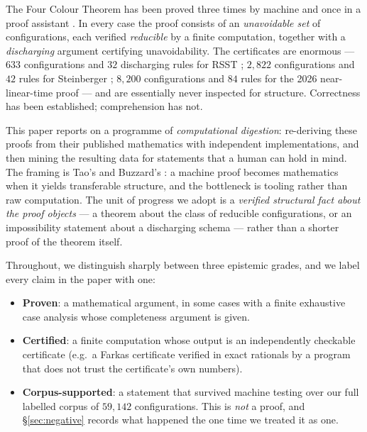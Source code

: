 \documentclass[11pt]{article}
\theoremstyle{definition}
\begin{document}
The Four Colour Theorem has been proved three times by machine
\cite{appel1977every,appel1977every2,rsst1997,steinberger2010,nl4ct2026} and once in
a proof assistant \cite{gonthier2008}. In every case the proof consists of an
\emph{unavoidable set} of configurations, each verified \emph{reducible} by a
finite computation, together with a \emph{discharging} argument certifying
unavoidability. The certificates are enormous --- $633$ configurations and
$32$ discharging rules for RSST \cite{rsst1997}; $2{,}822$ configurations and $42$
rules for Steinberger \cite{steinberger2010}; $8{,}200$ configurations and $84$
rules for the 2026 near-linear-time proof \cite{nl4ct2026} --- and are essentially
never inspected for structure. Correctness has been established; comprehension has
not.

This paper reports on a programme of \emph{computational digestion}: re-deriving
these proofs from their published mathematics with independent implementations, and
then mining the resulting data for statements that a human can hold in mind. The
framing is Tao's and Buzzard's \cite{tao2025machine,buzzard2024}: a machine proof
becomes mathematics when it yields transferable structure, and the bottleneck is
tooling rather than raw computation. The unit of progress we adopt is a
\emph{verified structural fact about the proof objects} --- a theorem about the
class of reducible configurations, or an impossibility statement about a
discharging schema --- rather than a shorter proof of the theorem itself.

Throughout, we distinguish sharply between three epistemic grades, and we label
every claim in the paper with one:
\begin{itemize}
  \item \textbf{Proven}: a mathematical argument, in some cases with a finite
        exhaustive case analysis whose completeness argument is given.
  \item \textbf{Certified}: a finite computation whose output is an independently
        checkable certificate (e.g.\ a Farkas certificate verified in exact
        rationals by a program that does not trust the certificate's own numbers).
  \item \textbf{Corpus-supported}: a statement that survived machine testing over
        our full labelled corpus of $59{,}142$ configurations. This is \emph{not} a
        proof, and \S\ref{sec:negative} records what happened the one time we
        treated it as one.
\end{itemize}
\end{document}
